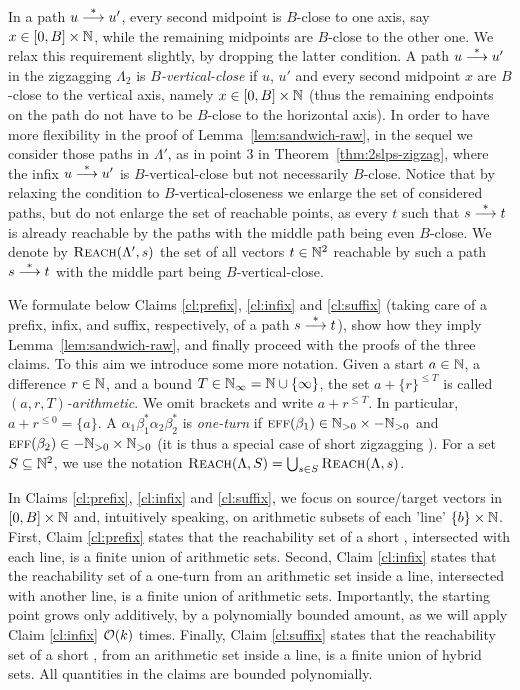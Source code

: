 \begin{appendixproof}
In a path $u\stackrel{*}{\longrightarrow} u'$, every second midpoint is $B$-close to one axis,
say $x\in [0, B] \times \mathbb{N}$,
while the remaining midpoints are $B$-close to the other one.
We relax this requirement slightly, by dropping the latter condition.
A path $u \stackrel{*}{\longrightarrow} u'$  in the zigzagging \slps $\Lambda_2$
is \emph{$B$-vertical-close} if $u$, $u'$ and every second midpoint $x$
are $B$-close to the vertical axis, namely $x \in [0, B] \times \mathbb{N}$
(thus the remaining endpoints on the path do not have to be $B$-close to the horizontal axis).
In order to have more flexibility in the proof of Lemma~\ref{lem:sandwich-raw},
in the sequel we consider those paths in $\Lambda'$, as in point 3 in Theorem~\ref{thm:2slps-zigzag}, where the infix
$u\stackrel{*}{\longrightarrow} u'$ is $B$-vertical-close but not necessarily $B$-close.
Notice that by relaxing the condition to $B$-vertical-closeness
we enlarge the set of considered paths, but do not enlarge the set of reachable points,
as every $t$ such that $s \stackrel{*}{\longrightarrow} t$ is already reachable by the paths with the middle path being even $B$-close.
We denote by $\textsc{Reach}(\Lambda', s)$ the set of all vectors $t\in\mathbb{N}^2$ reachable by such a path $s\stackrel{*}{\longrightarrow} t$ with
the middle part being $B$-vertical-close.

We formulate below Claims \ref{cl:prefix}, \ref{cl:infix} and \ref{cl:suffix}
(taking care of a prefix, infix, and suffix, respectively, of a path $s\stackrel{*}{\longrightarrow} t$), 
show how they imply Lemma~\ref{lem:sandwich-raw}, and finally proceed with the proofs of the three claims.
To this aim we introduce some more notation.
Given a start $a \in \mathbb{N}$, a difference $r \in \mathbb{N}$, and a bound $T \in \mathbb{N}_\infty = \mathbb{N}\cup\{\infty\}$,
the set $a + \{r\}^{\leq T}$ is called \emph{$(a, r, T)$-arithmetic}. 
We omit brackets and write $a + r^{\leq T}$.
In particular, $a + r^{\leq 0} = \{a\}$.
A \dslps  $\alpha_1 \beta_1^* \alpha_2 \beta_2^*$ is \emph{one-turn} if 
$\textsc{eff}(\beta_1) \in \mathbb{N}_{>0}  \times -\mathbb{N}_{>0}$ and $\textsc{eff}(\beta_2) \in -\mathbb{N}_{>0}  \times \mathbb{N}_{>0}$
(it is thus a special case of short zigzagging \dslps).
%
For a set $S\subseteq \mathbb{N}^2$, we use the notation $\textsc{Reach}(\Lambda, S) = \bigcup_{s\in S} \textsc{Reach}(\Lambda, s)$.

In Claims \ref{cl:prefix}, \ref{cl:infix} and \ref{cl:suffix}, we focus on source/target vectors
in $[0, B] \times \mathbb{N}$ and, intuitively speaking, on arithmetic subsets of each 'line' $\{b\}\times \mathbb{N}$.
First, Claim \ref{cl:prefix} states that the reachability set of a short \dslps, intersected with each line,
is a finite union of arithmetic sets.
Second, Claim \ref{cl:infix} states that the reachability set of a one-turn \dslps from 
an arithmetic set inside a line, intersected with another line, is a finite union of arithmetic sets.
Importantly, the starting point grows only additively, by a polynomially bounded amount, 
as we will apply Claim \ref{cl:infix} ${\cal O}(k)$ times.
Finally, Claim \ref{cl:suffix} states that the reachability set of a short \dslps, from an arithmetic set
inside a line, is a finite union of hybrid sets.
All quantities in the claims are bounded polynomially.


\end{appendixproof}
